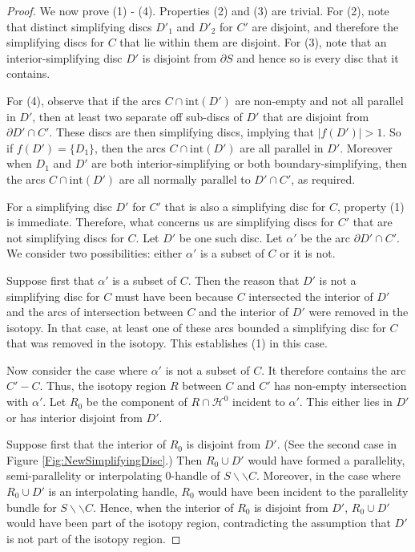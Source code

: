 \documentclass[oneside]{amsart}
\numberwithin{equation}{section}
\theoremstyle{plain}
\theoremstyle{definition}
\newcommand{\cut}{\backslash\backslash}
\newcommand{\calH}{\mathcal{H}}
\begin{document}
\begin{proof}
We now prove (1) - (4). Properties (2) and (3) are trivial. For (2), note that distinct simplifying discs $D'_1$ and $D'_2$ for $C'$ are disjoint, and therefore the simplifying discs for $C$ that lie within them are disjoint. For (3), note that an interior-simplifying disc $D'$ is disjoint from $\partial S$ and hence so is every disc that it contains. 

For (4), observe that if the arcs $C\cap \mathrm{int}(D')$ are non-empty and not all parallel in $D'$, then at least two separate off sub-discs of $D'$ that are disjoint from $\partial D' \cap C'$. These discs are then simplifying discs, implying that $|f(D')| > 1$. So if $f(D') = \{ D_1 \}$, then the arcs $C \cap \mathrm{int}(D')$ are all parallel in $D'$. Moreover when $D_1$ and $D'$ are both interior-simplifying or both boundary-simplifying, then the arcs $C \cap \mathrm{int}(D')$ are all normally parallel to $D' \cap C'$, as required.

For a simplifying disc $D'$ for $C'$ that is also a simplifying disc for $C$, property (1) is immediate. Therefore,
what concerns us are simplifying discs for $C'$ that are not simplifying discs for $C$. Let $D'$ be one such disc. Let $\alpha'$ be the arc $\partial D' \cap C'$. We consider two possibilities: either $\alpha'$ is a subset of $C$ or it is not.

Suppose first that $\alpha'$ is a subset of $C$. Then the reason that $D'$ is not a simplifying disc for $C$ must have been because $C$ intersected the interior of $D'$ and the arcs of intersection between $C$ and the interior of $D'$ were removed in the isotopy. In that case, at least one of these arcs bounded a simplifying disc for $C$ that was removed in the isotopy. 
This establishes (1) in this case.

Now consider the case where $\alpha'$ is not a subset of $C$. It therefore contains the arc $C' - C$. Thus, the isotopy region $R$ between $C$ and $C'$ has non-empty intersection with $\alpha'$. Let $R_0$ be the component of $R \cap \calH^0$ incident to $\alpha'$. This either lies in $D'$ or has interior disjoint from $D'$. 

Suppose first that the interior of $R_0$ is disjoint from $D'$. (See the second case in Figure \ref{Fig:NewSimplifyingDisc}.) Then $R_0 \cup D'$ would have formed a parallelity, semi-parallelity or interpolating 0-handle of $S \cut C$. Moreover, in the case where $R_0 \cup D'$ is an interpolating handle, $R_0$ would have been incident to the parallelity bundle for $S \cut C$. Hence, when the interior of $R_0$ is disjoint from $D'$, $R_0 \cup D'$ would have been part of the isotopy region, contradicting the assumption that $D'$ is not part of the isotopy region.


\end{proof}
\end{document}
